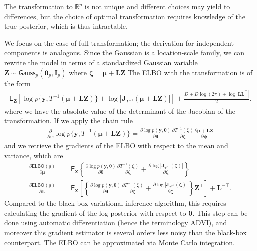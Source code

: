 \documentclass[
  11pt,
  letterpaper,
]{scrbook}
\theoremstyle{plain}
\theoremstyle{definition}
\theoremstyle{definition}
\theoremstyle{plain}
\theoremstyle{plain}
\theoremstyle{definition}
\theoremstyle{remark}
\begin{document}
The transformation to \(\mathbb{R}^p\) is not unique and different
choices may yield to differences, but the choice of optimal
transformation requires knowledge of the true posterior, which is thus
intractable.

We focus on the case of full transformation; the derivation for
independent components is analogous. Since the Gaussian is a
location-scale family, we can rewrite the model in terms of a
standardized Gaussian variable
\(\boldsymbol{Z}\sim \mathsf{Gauss}_p(\boldsymbol{0}_p, \mathbf{I}_p)\)
where
\(\boldsymbol{\zeta} = \boldsymbol{\mu} + \mathbf{L}\boldsymbol{Z}\) The
ELBO with the transformation is of the form \begin{align*}
 \mathsf{E}_{\boldsymbol{Z}}\left[ \log p\{\boldsymbol{y}, T^{-1}(\boldsymbol{\mu} + \mathbf{L}\boldsymbol{Z})\} + \log \left|\mathbf{J}_{T^{-1}}(\boldsymbol{\mu} + \mathbf{L}\boldsymbol{Z})\right|\right] +\frac{D+D\log(2\pi) + \log |\mathbf{LL}^\top|}{2}.
\end{align*} where we have the absolute value of the determinant of the
Jacobian of the transformation. If we apply the chain rule
\begin{align*}
 \frac{\partial}{\partial \boldsymbol{\psi}}\log p\{\boldsymbol{y}, T^{-1}(\boldsymbol{\mu} + \mathbf{L}\boldsymbol{Z})\} = \frac{\partial \log p(\boldsymbol{y}, \boldsymbol{\theta})}{\partial \boldsymbol{\theta}} \frac{\partial T^{-1}(\boldsymbol{\zeta})}{\partial \boldsymbol{\zeta}} \frac{\partial \boldsymbol{\mu} + \mathbf{L}\boldsymbol{Z}}{\partial \boldsymbol{\psi}}
\end{align*} and we retrieve the gradients of the ELBO with respect to
the mean and variance, which are \begin{align*}
 \frac{\partial \mathsf{ELBO}(g)}{\partial \boldsymbol{\mu}} &= \mathsf{E}_{\boldsymbol{Z}}\left\{\frac{\partial \log p(\boldsymbol{y}, \boldsymbol{\theta})}{\partial \boldsymbol{\theta}} \frac{\partial T^{-1}(\boldsymbol{\zeta})}{\partial \boldsymbol{\zeta}}  + \frac{\partial \log \left|\mathbf{J}_{T^{-1}}(\boldsymbol{\zeta})\right|}{\partial \boldsymbol{\zeta}}\right\} \\
 \frac{\partial \mathsf{ELBO}(g)}{\partial \mathbf{L}} &= \mathsf{E}_{\boldsymbol{Z}}\left[\left\{\frac{\partial \log p(\boldsymbol{y}, \boldsymbol{\theta})}{\partial \boldsymbol{\theta}} \frac{\partial T^{-1}(\boldsymbol{\zeta})}{\partial \boldsymbol{\zeta}}  + \frac{\partial \log \left|\mathbf{J}_{T^{-1}}(\boldsymbol{\zeta})\right|}{\partial \boldsymbol{\zeta}}\right\}\boldsymbol{Z}^\top\right] + \mathbf{L}^{-\top}.
\end{align*} Compared to the black-box variational inference algorithm,
this requires calculating the gradient of the log posterior with respect
to \(\boldsymbol{\theta}.\) This step can be done using automatic
differentiation (hence the terminology ADVI), and moreover this gradient
estimator is several orders less noisy than the black-box counterpart.
The ELBO can be approximated via Monte Carlo integration.
\end{document}
